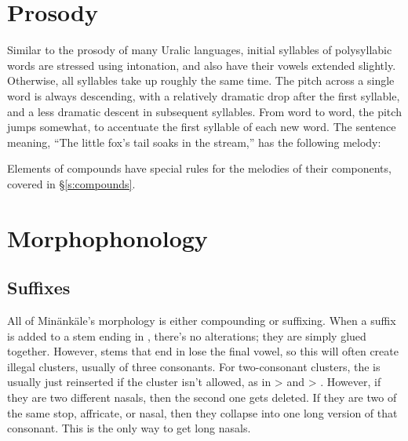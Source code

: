 \section{Prosody}
Similar to the prosody of many Uralic languages, initial syllables of
polysyllabic words are stressed using intonation, and also have their vowels
extended slightly. Otherwise, all syllables take up roughly the same time. The
pitch across a single word is always descending, with a relatively dramatic drop
after the first syllable, and a less dramatic descent in subsequent syllables.
From word to word, the pitch jumps somewhat, to accentuate the first syllable of
each new word. The sentence 
meaning, ``The little fox's tail soaks in the stream,'' has the following
melody:

\begin{center}
\end{center}\vspace{-1em}

\noindent Elements of compounds have special rules for the melodies of their
components, covered in \S\ref{s:compounds}.

\section{Morphophonology}
\subsection{Suffixes}
All of Min\"ank\"ale's morphology
is either compounding or suffixing. When a suffix is added to a stem ending in
, there's no alterations; they are simply glued together. However,
stems that end in  lose the final vowel, so this will often create
illegal clusters, usually of three consonants. For two-consonant clusters, the
 is usually just reinserted if the cluster isn't allowed, as in
 >  and  > . However, if
they are two different nasals, then the second one gets deleted. If they are two
of the same stop, affricate, or nasal, then they collapse into one long version
of that consonant. This is the only way to get long nasals.

